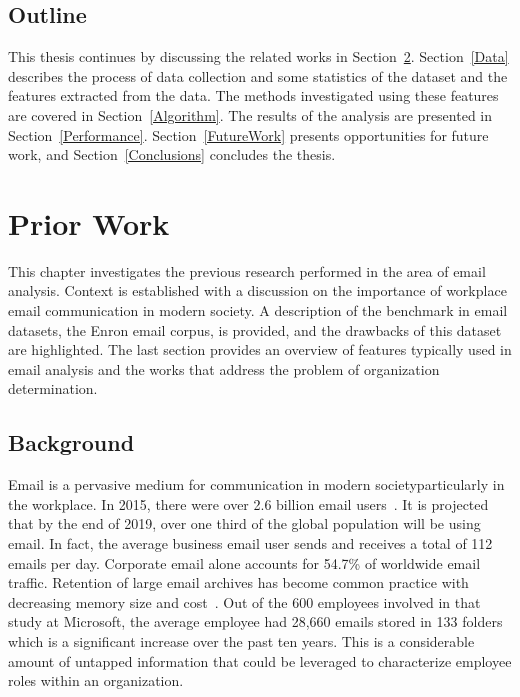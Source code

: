 \documentclass[12pt]{report}
\begin{document}
\section{Outline}
This thesis continues by discussing the related works in Section~\ref{PriorWork}.  
Section~\ref{Data} describes the process of data collection and some statistics of the dataset and the features extracted from the data.
The methods investigated using these features are covered in Section~\ref{Algorithm}.
The results of the analysis are presented in Section~\ref{Performance}.
 Section~\ref{FutureWork} presents opportunities for future work, and Section~\ref{Conclusions} concludes the thesis.


\chapter{Prior Work} \label{PriorWork}
This chapter investigates the previous research performed in the area of email analysis.
Context is established with a discussion on the importance of workplace email communication in modern society.
A description of the benchmark in email datasets, the Enron email corpus, is provided, and the drawbacks of this dataset are highlighted.
The last section provides an overview of features typically used in email analysis and the works that address the problem of organization determination.

\section{Background}
Email is a pervasive medium for communication in modern society\textemdash{}particularly in the workplace.
In 2015, there were over 2.6 billion email users~\cite{radicati_emails_2015}.
It is projected that by the end of 2019, over one third of the global population will be using email.
In fact, the average business email user sends and receives a total of 112 emails per day.
Corporate email alone accounts for 54.7\% of worldwide email traffic.
Retention of large email archives has become common practice with decreasing memory size and cost~\cite{fisher_revisiting_2006}.
Out of the 600 employees involved in that study at Microsoft, the average employee had 28,660 emails stored in 133 folders which is a significant increase over the past ten years.
This is a considerable amount of untapped information that could be leveraged to characterize employee roles within an organization.
\end{document}

